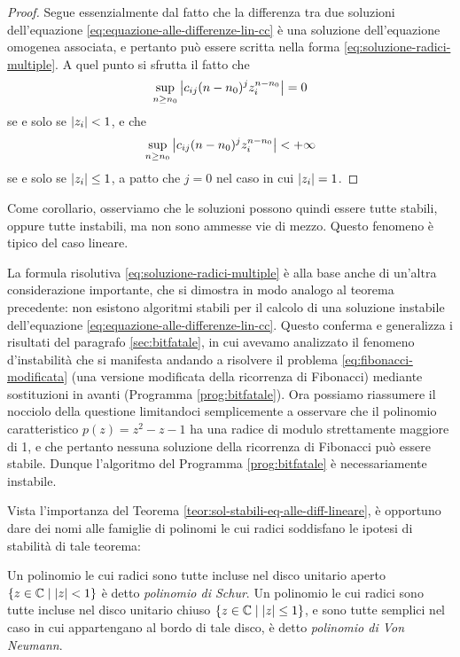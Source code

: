 \begin{proof}
Segue essenzialmente dal fatto che la differenza tra due soluzioni
dell'equazione \eqref{eq:equazione-alle-differenze-lin-cc}
è una soluzione dell'equazione omogenea associata, e pertanto
può essere scritta nella forma \eqref{eq:soluzione-radici-multiple}.
A quel punto si sfrutta il fatto che
\[
\sup_{n \geq n_0} \left\lvert c_{ij} (n-n_0)^j z_i^{n-n_0}\right\rvert = 0
\]
se e solo se $\left\lvert z_i\right\rvert < 1$, e che
\[
\sup_{n \geq n_0} \left\lvert c_{ij} (n-n_0)^j z_i^{n-n_0}\right\rvert < +\infty
\]
se e solo se $\left\lvert z_i\right\rvert \leq 1$, a patto che $j = 0$ nel caso in cui $\left\lvert z_i\right\rvert = 1$.
\end{proof}

Come corollario, osserviamo che le soluzioni possono quindi essere tutte stabili,
oppure tutte instabili, ma non sono ammesse vie di mezzo. Questo fenomeno
è tipico del caso lineare.

La formula risolutiva \eqref{eq:soluzione-radici-multiple}
è alla base anche di un'altra considerazione importante, che si dimostra
in modo analogo al teorema precedente: non esistono algoritmi stabili
per il calcolo di una soluzione instabile dell'equazione
\eqref{eq:equazione-alle-differenze-lin-cc}.
Questo conferma e generalizza i risultati del paragrafo \ref{sec:bitfatale},
in cui avevamo analizzato il fenomeno d'instabilità che si manifesta
andando a risolvere il problema \ref{eq:fibonacci-modificata}
(una versione modificata della ricorrenza di Fibonacci)
mediante sostituzioni in avanti (Programma \ref{prog:bitfatale}).
Ora possiamo riassumere il nocciolo della questione limitandoci
semplicemente a osservare che il polinomio caratteristico
$p(z) = z^2-z-1$ ha una radice di modulo strettamente maggiore di 1,
e che pertanto nessuna soluzione della ricorrenza di Fibonacci
può essere stabile. Dunque l'algoritmo del Programma \ref{prog:bitfatale}
è necessariamente instabile.

Vista l'importanza del Teorema \ref{teor:sol-stabili-eq-alle-diff-lineare},
è opportuno dare dei nomi alle famiglie di polinomi le cui radici
soddisfano le ipotesi di stabilità di tale teorema:

\begin{defi}
Un polinomio le cui radici sono tutte incluse nel disco unitario aperto
$\{z \in \mathbb{C} \mid \left\lvert z\right\rvert < 1\}$ è detto \emph{polinomio di Schur}.
Un polinomio le cui radici sono tutte incluse nel disco unitario chiuso
$\{z \in \mathbb{C} \mid \left\lvert z\right\rvert \leq 1\}$, e sono tutte semplici nel caso
in cui appartengano al bordo di tale disco, è detto \emph{polinomio di Von Neumann}.
\end{defi}

